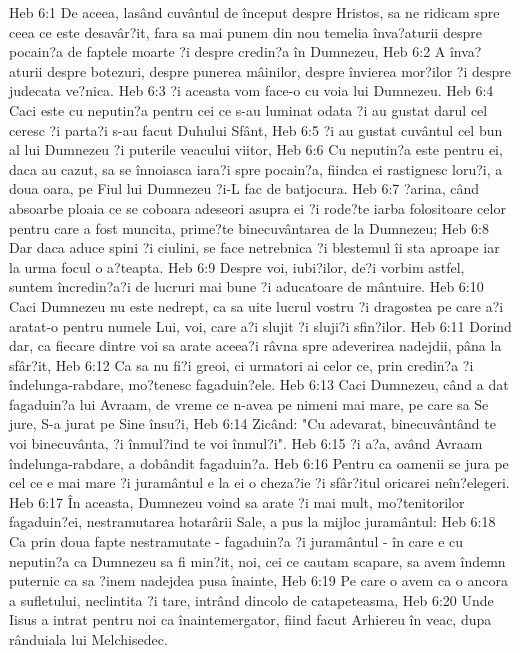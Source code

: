 Heb 6:1  De aceea, lasând cuvântul de început despre Hristos, sa ne ridicam spre ceea ce este desavâr?it, fara sa mai punem din nou temelia înva?aturii despre pocain?a de faptele moarte ?i despre credin?a în Dumnezeu,
Heb 6:2  A înva?aturii despre botezuri, despre punerea mâinilor, despre învierea mor?ilor ?i despre judecata ve?nica.
Heb 6:3  ?i aceasta vom face-o cu voia lui Dumnezeu.
Heb 6:4  Caci este cu neputin?a pentru cei ce s-au luminat odata ?i au gustat darul cel ceresc ?i parta?i s-au facut Duhului Sfânt,
Heb 6:5  ?i au gustat cuvântul cel bun al lui Dumnezeu ?i puterile veacului viitor,
Heb 6:6  Cu neputin?a este pentru ei, daca au cazut, sa se înnoiasca iara?i spre pocain?a, fiindca ei rastignesc loru?i, a doua oara, pe Fiul lui Dumnezeu ?i-L fac de batjocura.
Heb 6:7  ?arina, când absoarbe ploaia ce se coboara adeseori asupra ei ?i rode?te iarba folositoare celor pentru care a fost muncita, prime?te binecuvântarea de la Dumnezeu;
Heb 6:8  Dar daca aduce spini ?i ciulini, se face netrebnica ?i blestemul îi sta aproape iar la urma focul o a?teapta.
Heb 6:9  Despre voi, iubi?ilor, de?i vorbim astfel, suntem încredin?a?i de lucruri mai bune ?i aducatoare de mântuire.
Heb 6:10  Caci Dumnezeu nu este nedrept, ca sa uite lucrul vostru ?i dragostea pe care a?i aratat-o pentru numele Lui, voi, care a?i slujit ?i sluji?i sfin?ilor.
Heb 6:11  Dorind dar, ca fiecare dintre voi sa arate aceea?i râvna spre adeverirea nadejdii, pâna la sfâr?it,
Heb 6:12  Ca sa nu fi?i greoi, ci urmatori ai celor ce, prin credin?a ?i îndelunga-rabdare, mo?tenesc fagaduin?ele.
Heb 6:13  Caci Dumnezeu, când a dat fagaduin?a lui Avraam, de vreme ce n-avea pe nimeni mai mare, pe care sa Se jure, S-a jurat pe Sine însu?i,
Heb 6:14  Zicând: "Cu adevarat, binecuvântând te voi binecuvânta, ?i înmul?ind te voi înmul?i".
Heb 6:15  ?i a?a, având Avraam îndelunga-rabdare, a dobândit fagaduin?a.
Heb 6:16  Pentru ca oamenii se jura pe cel ce e mai mare ?i juramântul e la ei o cheza?ie ?i sfâr?itul oricarei neîn?elegeri.
Heb 6:17  În aceasta, Dumnezeu voind sa arate ?i mai mult, mo?tenitorilor fagaduin?ei, nestramutarea hotarârii Sale, a pus la mijloc juramântul:
Heb 6:18  Ca prin doua fapte nestramutate - fagaduin?a ?i juramântul - în care e cu neputin?a ca Dumnezeu sa fi min?it, noi, cei ce cautam scapare, sa avem îndemn puternic ca sa ?inem nadejdea pusa înainte,
Heb 6:19  Pe care o avem ca o ancora a sufletului, neclintita ?i tare, intrând dincolo de catapeteasma,
Heb 6:20  Unde Iisus a intrat pentru noi ca înaintemergator, fiind facut Arhiereu în veac, dupa rânduiala lui Melchisedec.
